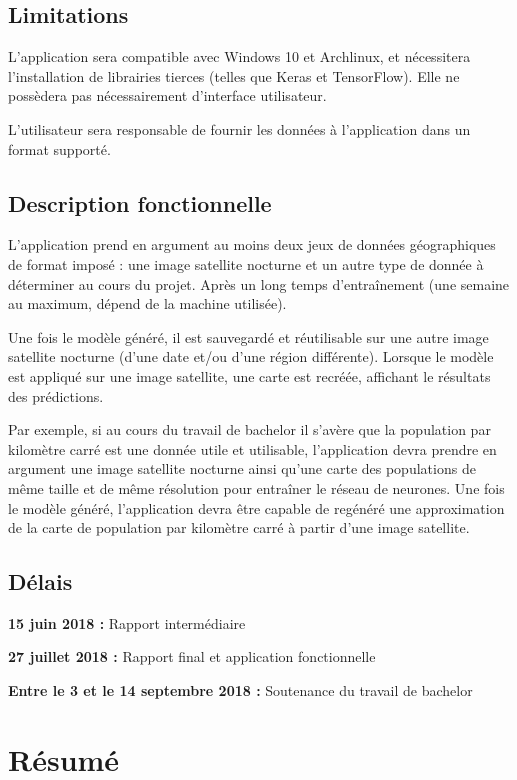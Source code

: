 \documentclass[a4paper]{report}
\begin{document}
\section{Limitations}
L'application sera compatible avec Windows 10 et Archlinux, et nécessitera l'installation de librairies tierces (telles que Keras et TensorFlow).
Elle ne possèdera pas nécessairement d'interface utilisateur.

L'utilisateur sera responsable de fournir les données à l'application dans un format supporté.

\section{Description fonctionnelle}
L'application prend en argument au moins deux jeux de données géographiques de format imposé : une image satellite nocturne et un autre type de donnée à déterminer au cours du projet. Après un long temps d'entraînement (une semaine au maximum, dépend de la machine utilisée).

Une fois le modèle généré, il est sauvegardé et réutilisable sur une autre image satellite nocturne (d'une date et/ou d'une région différente). Lorsque le modèle est appliqué sur une image satellite, une carte est recréée, affichant le résultats des prédictions.

Par exemple, si au cours du travail de bachelor il s'avère que la population par kilomètre carré est une donnée utile et utilisable, l'application devra prendre en argument une image satellite nocturne ainsi qu'une carte des populations de même taille et de même résolution pour entraîner le réseau de neurones. Une fois le modèle généré, l'application devra être capable de regénéré une approximation de la carte de population par kilomètre carré à partir d'une image satellite.

\section{Délais}
\textbf{15 juin 2018 :} Rapport intermédiaire

\textbf{27 juillet 2018 :} Rapport final et application fonctionnelle

\textbf{Entre le 3 et le 14 septembre 2018 :} Soutenance du travail de bachelor
\tableofcontents


\chapter{Résumé}
\end{document}
